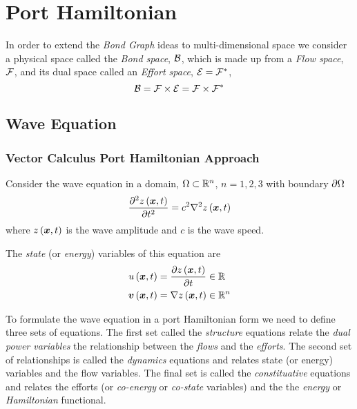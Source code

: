 \clearemptydoublepage
\chapter{Port Hamiltonian}
\label{cha:PortHamiltonian}

In order to extend the \emph{Bond Graph} ideas to multi-dimensional space we
consider a physical space called the \emph{Bond space}, $ \mathcal{B} $, which
is made up from a \emph{Flow space}, $ \mathcal{F} $, and its dual space
called an \emph{Effort space}, $ \mathcal{E} =  \mathcal{F} ^{*} $, \ie
\begin{equation}
   \mathcal{B} =  \mathcal{F}  \times  \mathcal{E}  =  \mathcal{F}  \times   \mathcal{F} ^{*}  
\end{equation}

\section{Wave Equation}
\label{sec:PHWaveEquation}

\subsection{Vector Calculus Port Hamiltonian Approach}

Consider the wave equation in a domain, $\Omega\subset\rntopology{n}$,
$n=1,2,3$ with boundary $ \partial{\Omega} $ \ie
\begin{equation}
  \deltwosqby{\fnof{z}{\vectr{x},t}}{t}=c^{2}\laplacian{}{\fnof{z}{\vectr{x},t}}
\end{equation}
where $ z\left(  \boldsymbol{x} ,t \right) $ is the wave amplitude and $c$ is the wave speed.

The \emph{state} (or \emph{energy}) variables of this equation are
\begin{align}
    \fnof{u}{\vectr{x},t}&=\delby{\fnof{z}{\vectr{x},t}}{t}\in\rntopology{} \\
    \fnof{\vectr{v}}{\vectr{x},t}&=\gradient{}{\fnof{z}{\vectr{x},t}}\in\rntopology{n}
\end{align}

To formulate the wave equation in a port Hamiltonian form we need to define
three sets of equations. The first set called the \emph{structure} equations
relate the \emph{dual power variables} \ie the relationship between the
\emph{flows} and the \emph{efforts}. The second set of relationships is called
the \emph{dynamics} equations and relates state (or energy) variables and the
flow variables. The final set is called the \emph{constituative} equations and
relates the efforts (or \emph{co-energy} or \emph{co-state} variables) and the
the \emph{energy} or \emph{Hamiltonian} functional.

